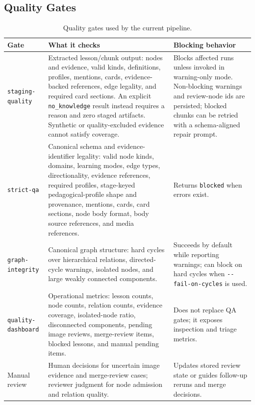 \documentclass[11pt,letterpaper]{article}
\newcommand{\code}[1]{\nolinkurl{#1}}
\begin{document}
\subsection{Quality Gates}

\begin{table}[H]
\centering
\small
\begin{tabularx}{\textwidth}{@{}P{0.22\textwidth}YP{0.22\textwidth}@{}}
\toprule
Gate & What it checks & Blocking behavior\\
\midrule
\code{staging-quality} & Extracted lesson/chunk output: nodes and evidence, valid kinds, definitions, profiles, mentions, cards, evidence-backed references, edge legality, and required card sections. An explicit \code{no_knowledge} result instead requires a reason and zero staged artifacts. Synthetic or quality-excluded evidence cannot satisfy coverage. & Blocks affected runs unless invoked in warning-only mode. Non-blocking warnings and review-node ids are persisted; blocked chunks can be retried with a schema-aligned repair prompt.\\
\code{strict-qa} & Canonical schema and evidence-identifier legality: valid node kinds, domains, learning modes, edge types, directionality, evidence references, required profiles, stage-keyed pedagogical-profile shape and provenance, mentions, cards, card sections, node body format, body source references, and media references. & Returns \code{blocked} when errors exist.\\
\code{graph-integrity} & Canonical graph structure: hard cycles over hierarchical relations, directed-cycle warnings, isolated nodes, and large weakly connected components. & Succeeds by default while reporting warnings; can block on hard cycles when \code{--fail-on-cycles} is used.\\
\code{quality-dashboard} & Operational metrics: lesson counts, node counts, relation counts, evidence coverage, isolated-node ratio, disconnected components, pending image reviews, merge-review items, blocked lessons, and manual pending items. & Does not replace QA gates; it exposes inspection and triage metrics.\\
Manual review & Human decisions for uncertain image evidence and merge-review cases; reviewer judgment for node admission and relation quality. & Updates stored review state or guides follow-up reruns and merge decisions.\\
\bottomrule
\end{tabularx}
\caption{Quality gates used by the current pipeline.}
\label{tab:quality-gates}
\end{table}
\end{document}
